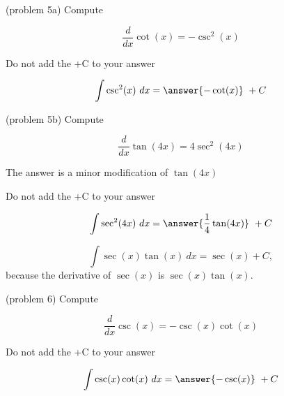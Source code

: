 \documentclass[handout]{ximera}
\begin{document}
\begin{problem}(problem 5a)
Compute 

\begin{hint}
\[
\frac{d}{dx} \cot(x) = -\csc^2(x)
\]
\end{hint}
\begin{hint}
\begin{center}
Do not add the +C to your answer
\end{center}
\end{hint}

\[
\int \csc^2(x) \ dx =
\answer{-\cot(x)} \ + C
\]
\end{problem}

\begin{problem}(problem 5b)
Compute 

\begin{hint}
\[
\frac{d}{dx} \tan(4x) = 4\sec^2(4x)
\]
\end{hint}
\begin{hint}
The answer is a minor modification of $\tan(4x)$
\end{hint}
\begin{hint}
\begin{center}
Do not add the +C to your answer
\end{center}
\end{hint}

\[
\int \sec^2(4x) \ dx =
\answer{\frac14\tan(4x)} \ + C
\]
\end{problem}

\begin{example}[example 6]
\[
\int \sec(x)\tan(x) \ dx = \sec(x) + C,
\]
because the derivative of $\sec(x)$ is $\sec(x)\tan(x)$.

\end{example}


\begin{problem}(problem 6)
Compute 

\begin{hint}
\[
\frac{d}{dx} \csc(x) = -\csc(x)\cot(x)
\]
\end{hint}
\begin{hint}
\begin{center}
Do not add the +C to your answer
\end{center}
\end{hint}

\[
\int \csc(x)\cot(x) \ dx =
\answer{-\csc(x)} \ + C
\]
\end{problem}
\end{document}
